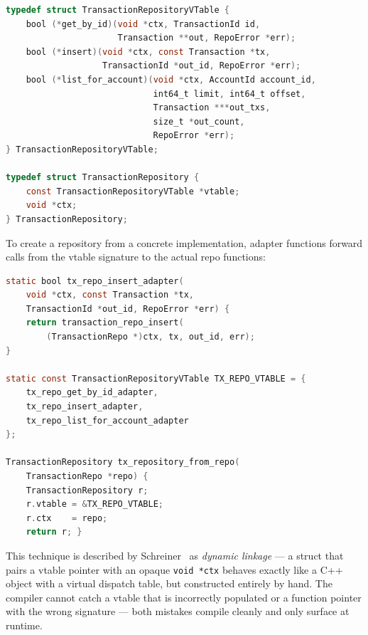 \noindent\begin{minipage}{\linewidth}
\begin{lstlisting}[language=C, caption={transaction\_service.h --- VTable pattern.
Each method is a function pointer; \texttt{ctx} holds implementation-specific
state.}]
typedef struct TransactionRepositoryVTable {
    bool (*get_by_id)(void *ctx, TransactionId id,
                      Transaction **out, RepoError *err);
    bool (*insert)(void *ctx, const Transaction *tx,
                   TransactionId *out_id, RepoError *err);
    bool (*list_for_account)(void *ctx, AccountId account_id,
                             int64_t limit, int64_t offset,
                             Transaction ***out_txs,
                             size_t *out_count,
                             RepoError *err);
} TransactionRepositoryVTable;

typedef struct TransactionRepository {
    const TransactionRepositoryVTable *vtable;
    void *ctx;
} TransactionRepository;
\end{lstlisting}\end{minipage}

To create a repository from a concrete implementation, adapter functions forward
calls from the vtable signature to the actual repo functions:

\enlargethispage{1\baselineskip}
\begin{lstlisting}[language=C, caption={transaction\_service.c --- Adapter
functions bridge the generic vtable to the concrete repo. The pattern matches the
``Class'' structure.}]
static bool tx_repo_insert_adapter(
    void *ctx, const Transaction *tx,
    TransactionId *out_id, RepoError *err) {
    return transaction_repo_insert(
        (TransactionRepo *)ctx, tx, out_id, err);
}

static const TransactionRepositoryVTable TX_REPO_VTABLE = {
    tx_repo_get_by_id_adapter,
    tx_repo_insert_adapter,
    tx_repo_list_for_account_adapter
};

TransactionRepository tx_repository_from_repo(
    TransactionRepo *repo) {
    TransactionRepository r;
    r.vtable = &TX_REPO_VTABLE;
    r.ctx    = repo;
    return r; }
\end{lstlisting}

This technique is described by Schreiner~\cite{Schreiner1993} as
\emph{dynamic linkage} --- a struct that pairs a vtable pointer with an
opaque \texttt{void *ctx} behaves exactly like a C++ object with a virtual
dispatch table, but constructed entirely by hand. The compiler cannot catch a 
vtable that is incorrectly populated or a function pointer with the wrong 
signature — both mistakes compile cleanly and only surface at runtime.

